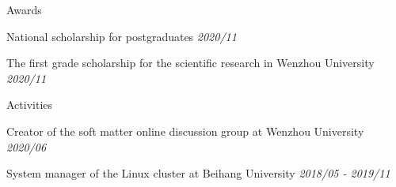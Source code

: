 \documentclass{resume} %
\begin{document}
\begin{rSection}{Awards}
	\begin{rSubsection}{}{}{}{}
		\item National scholarship for postgraduates \hfill \textit{2020/11}
		\item The first grade scholarship for the scientific research in Wenzhou University \hfill \textit{2020/11}
	\end{rSubsection}
\end{rSection}

\begin{rSection}{Activities}
	\begin{rSubsection}{}{}{}{}
		\item Creator of the soft matter online discussion group at Wenzhou University \hfill \textit{2020/06} 
		\item System manager of the Linux cluster at Beihang University \hfill \textit{2018/05 - 2019/11}
	\end{rSubsection}
\end{rSection}
\end{document}

